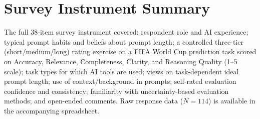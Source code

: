 \documentclass[conference]{IEEEtran}
\begin{document}
\section{Survey Instrument Summary}
The full 38-item survey instrument covered: respondent role and AI experience; typical prompt habits and beliefs about prompt length; a controlled three-tier (short/medium/long) rating exercise on a FIFA World Cup prediction task scored on Accuracy, Relevance, Completeness, Clarity, and Reasoning Quality (1--5 scale); task types for which AI tools are used; views on task-dependent ideal prompt length; use of context/background in prompts; self-rated evaluation confidence and consistency; familiarity with uncertainty-based evaluation methods; and open-ended comments. Raw response data ($N=114$) is available in the accompanying spreadsheet.
\end{document}
